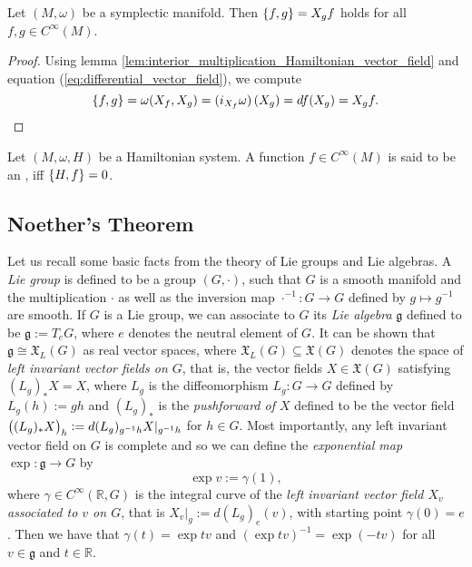 \begin{lemma}
	\label{lem:Poisson_bracket_equivalent}
	Let $(M,\omega)$ be a symplectic manifold. Then $\cbr{f,g} = X_gf$ holds for all $f,g \in C^\infty(M)$.
\end{lemma}

\begin{proof}
	Using lemma \ref{lem:interior_multiplication_Hamiltonian_vector_field} and equation (\ref{eq:differential_vector_field}), we compute
	\begin{equation*}
		\cbr{f,g} = \omega(X_f,X_g) = \del[0]{i_{X_f}\omega}(X_g) = df(X_g) = X_g f.
	\end{equation*}
\end{proof}

\begin{definition}
	Let $(M,\omega,H)$ be a Hamiltonian system. A function $f \in C^\infty(M)$ is said to be an , iff $\cbr{H,f} = 0$.
\end{definition}

\subsection*{Noether's Theorem}
Let us recall some basic facts from the theory of Lie groups and Lie algebras. A \emph{Lie group} is defined to be a group $(G,\cdot)$, such that $G$ is a smooth manifold and the multiplication $\cdot$ as well as the inversion map $\cdot^{-1} : G \to G$ defined by $g\mapsto g^{-1}$ are smooth. If $G$ is a Lie group, we can associate to $G$ its \emph{Lie algebra} $\mathfrak{g}$ defined to be $\mathfrak{g} := T_eG$, where $e$ denotes the neutral element of $G$. It can be shown that $\mathfrak{g} \cong \mathfrak{X}_L(G)$ as real vector spaces, where $\mathfrak{X}_L(G) \subseteq \mathfrak{X}(G)$ denotes the space of \emph{left invariant vector fields on $G$}, that is, the vector fields $X \in \mathfrak{X}(G)$ satisfying $(L_g)_* X = X$, where $L_g$ is the diffeomorphism $L_g : G \to G$ defined by $L_g(h) := gh$ and $(L_g)_*$ is the \emph{pushforward of $X$} defined to be the vector field $\del[1]{(L_g)_*X}_h := d(L_g)_{g^{-1}h}X\vert_{g^{-1}h}$ for $h \in G$. Most importantly, any left invariant vector field on $G$ is complete and so we can define the \emph{exponential map} $\exp : \mathfrak{g} \to G$ by 
\begin{equation*}
	\exp v := \gamma(1),
\end{equation*}
\noindent where $\gamma \in C^\infty(\mathbb{R},G)$ is the integral curve of the \emph{left invariant vector field $X_v$ associated to $v$ on $G$}, that is $X_v\vert_g := d(L_g)_e(v)$, with starting point $\gamma(0) = e$. Then we have that $\gamma(t) = \exp tv$ and $(\exp tv)^{-1} = \exp (-tv)$ for all $v \in \mathfrak{g}$ and $t \in \mathbb{R}$.

